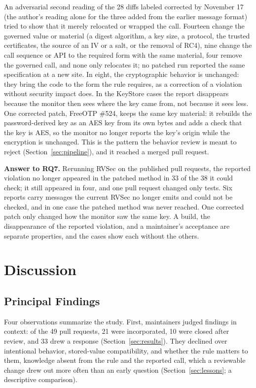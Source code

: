 \documentclass[conference]{IEEEtran}
\newcommand{\researchq}[1]{\textbf{RQ#1}}
\begin{document}
An adversarial second reading of the 28 diffs labeled corrected by November
17 (the author's reading alone for the three added from the earlier message
format) tried to show that it
merely relocated or wrapped the call. Fourteen change the
governed value or material (a digest algorithm, a key size, a protocol, the trusted
certificates, the source of an IV or a salt, or the removal of RC4), nine change the call sequence or API to the
required form with the same material, four remove the governed call, and none
only relocates it; no patched run reported the same specification at a new
site. In eight, the cryptographic behavior is unchanged: they bring the code to
the form the rule requires, as a correction of a violation without security
impact does. In the KeyStore cases the report disappears because the monitor
then sees where the key came from, not because it sees less. One corrected
patch, FreeOTP \#524, keeps the same key material: it rebuilds the
password-derived key as an AES key from its own bytes and adds a check that
the key is AES, so the monitor no longer reports the key's origin while the
encryption is unchanged. This is the pattern the behavior review is meant to
reject (Section~\ref{sec:pipeline}), and it reached a merged pull request.

\textbf{Answer to \researchq{7}.} Rerunning RVSec on the published pull
requests, the reported violation no longer appeared in the patched method in
33 of the 38 it could check; it still appeared in four, and one pull request
changed only tests. Six reports carry messages the current RVSec no longer
emits and could not be checked, and in one case the patched method was never
reached. One corrected patch only changed how the monitor saw the same key. A build, the disappearance of the reported violation, and a
maintainer's acceptance are separate properties, and the cases show each
without the others.

\section{Discussion}
\label{sec:discussion}

\subsection{Principal Findings}

Four observations summarize the study. First, maintainers judged findings in
context: of the 49 pull requests, 21 were incorporated, 10 were closed after
review, and 33 drew a response (Section~\ref{sec:results}). They declined over
intentional behavior, stored-value compatibility, and whether the rule matters
to them, knowledge absent from the rule and the reported call, which a
reviewable change drew out more often than an early question
(Section~\ref{sec:lessons}; a descriptive comparison).
\end{document}
